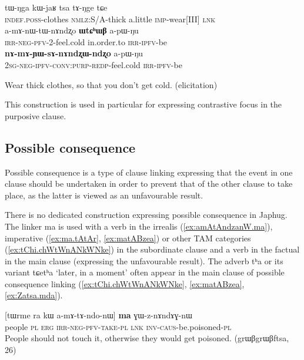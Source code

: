 \documentclass[oldfontcommands,oneside,a4paper,11pt]{article}
\newcommand{\ipa}[1]{{\phon \mbox{#1}}} %
\newcommand{\refb}[1]{(\ref{#1})}
\begin{document}
\begin{exe}
\ex \begin{xlist}
 \ex \label{ex:WtChWB.supporting2}  
\gll 
 \ipa{tɯ-ŋga}    	\ipa{kɯ-jaʁ}    	\ipa{tsa}    	\ipa{tɤ-ŋge} \ipa{tɕe}\\
 \textsc{indef.poss}-clothes \textsc{nmlz}:S/A-thick a.little \textsc{imp}-wear[III]  \textsc{lnk}\\ 
 \ex \label{ex:WtChWB.apWNu}  
\gll 
 	\ipa{a-mɤ-nɯ-tɯ-nɤndʐo}    	\ipa{\textbf{ɯtɕʰɯβ}}    	\ipa{a-pɯ-ŋu}    	\\
  \textsc{irr-neg-pfv}-2-feel.cold in.order.to \textsc{irr-ipfv}-be \\
\ex \label{ex:nAmAYWznAnAndzxWndzxo.apWNu}
\gll
\ipa{\textbf{nɤ-mɤ-ɲɯ-sɤ-nɤndʐɯ-ndʐo}}    	\ipa{a-pɯ-ŋu}\\
 \textsc{2sg-neg-ipfv-conv:purp-redp}-feel.cold \textsc{irr-ipfv}-be\\
  \end{xlist}
\glt Wear thick clothes, so that you don't get cold. (elicitation)
 \end{exe}

This construction is used in particular for expressing contrastive focus in the purposive clause.



\subsection{Possible consequence} \label{sec:possible.consequence}
Possible consequence is a type of clause linking expressing that the event in one clause should be undertaken in order to prevent that of the other clause to take place, as the latter is viewed as an unfavourable result. 
 
 There is no  dedicated construction expressing possible consequence in Japhug. The linker \ipa{ma} is used with a verb in the irrealis \refb{ex:amAtAndzanW.ma}, imperative (\ref{ex:ma.tAtAr}, \ref{ex:matABzea}) or other TAM categories \refb{ex:tChi.chWtWnANkWNke} in the subordinate clause and a verb in the factual in the main clause (expressing the unfavourable result). The adverb \ipa{tʰa} or its variant \ipa{tɕetʰa} `later, in a moment' often appear in the main clause of possible consequence linking (\ref{ex:tChi.chWtWnANkWNke}, \ref{ex:matABzea}, \ref{ex:Zatsa.mda}).
 
 
 \begin{exe}
\ex \label{ex:amAtAndzanW.ma}
\gll 
[\ipa{tɯrme}    	\ipa{ra}    	\ipa{kɯ}    	\ipa{a-mɤ-tɤ-ndo-nɯ]}    	\ipa{\textbf{ma}}    	\ipa{ɣɯ-z-nɤndɤɣ-nɯ}        \\
people \textsc{pl} \textsc{erg} \textsc{irr-neg-pfv-take}-\textsc{pl} \textsc{lnk} \textsc{inv-caus}-be.poisoned-\textsc{pl} \\
\glt People should not touch it, otherwise they would get poisoned. (grɯβgrɯβftsa, 26)
 \end{exe}
 
\end{document}
